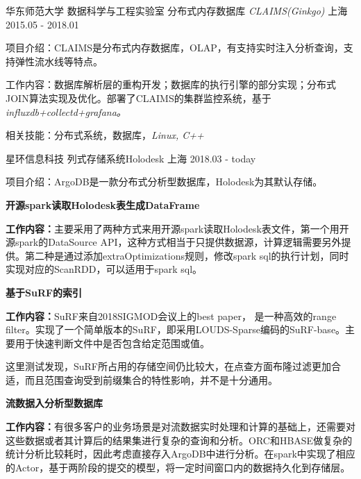 \begin{cventries}
  \cventry
    {华东师范大学 \quad 数据科学与工程实验室  } 
    {分布式内存数据库  \it{CLAIMS(Ginkgo)}}
    {上海}
    {2015.05 - 2018.01}
    {
      \begin{cvitems}
	\item {项目介绍：CLAIMS是分布式内存数据库，OLAP，有支持实时注入分析查询，支持弹性流水线等特点。}
	\item {工作内容：数据库解析层的重构开发；数据库的执行引擎的部分实现；分布式JOIN算法实现及优化。部署了CLAIMS的集群监控系统，基于\it{influxdb+collectd+grafana}。}
	\item {相关技能：分布式系统，数据库，\it{Linux, C++}}
      \end{cvitems}
    }

    \cventry
    {星环信息科技}
    {列式存储系统Holodesk}
    {上海}
    {2018.03 - today}
    {
      \begin{cvitems}
        \item {项目介绍：ArgoDB是一款分布式分析型数据库，Holodesk为其默认存储。}
      \end{cvitems}
    }

    \cventry
    {\textbf{开源spark读取Holodesk表生成DataFrame}}{}{}{}
    {
        \begin{cvitems}
          \item {\textbf{工作内容：}主要采用了两种方式来用开源spark读取Holodesk表文件，第一个用开源spark的DataSource API，这种方式相当于只提供数据源，计算逻辑需要另外提供。第二种是通过添加extraOptimizations规则，修改spark sql的执行计划，同时实现对应的ScanRDD，可以适用于spark sql。}
        \end{cvitems}
    }

    \cventry
    {\textbf{基于SuRF的索引}}{}{}{}
    {
        \begin{cvitems}
          \item {\textbf{工作内容：}SuRF来自2018SIGMOD会议上的best paper， 是一种高效的range filter。实现了一个简单版本的SuRF，即采用LOUDS-Sparse编码的SuRF-base。主要用于快速判断文件中是否包含给定范围或值。}
	  \item {这里测试发现，SuRF所占用的存储空间仍比较大，在点查方面布隆过滤更加合适，而且范围查询受到前缀集合的特性影响，并不是十分通用。}
        \end{cvitems}
    }

    \cventry
    {\textbf{流数据入分析型数据库}}{}{}{}
    {
        \begin{cvitems}
          \item {\textbf{工作内容：}有很多客户的业务场景是对流数据实时处理和计算的基础上，还需要对这些数据或者其计算后的结果集进行复杂的查询和分析。ORC和HBASE做复杂的统计分析比较耗时，因此考虑直接存入ArgoDB中进行分析。在spark中实现了相应的Actor，基于两阶段的提交的模型，将一定时间窗口内的数据持久化到存储层。}
        \end{cvitems}
    }

\end{cventries}

